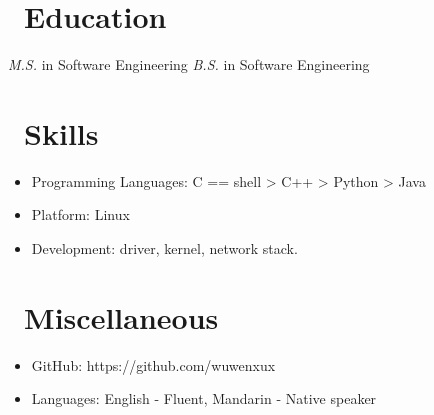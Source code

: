 \documentclass{resume}
\begin{document}

\section{\faGraduationCap\ Education}
\textit{M.S.} in Software Engineering 
\textit{B.S.} in Software Engineering 

\section{\faCogs\ Skills}
\begin{itemize}[parsep=0.5ex]
  \item Programming Languages: C == shell > C++  > Python > Java
  \item Platform: Linux
  \item Development: driver, kernel, network stack.
\end{itemize}

\section{\faInfo\ Miscellaneous}
\begin{itemize}[parsep=0.5ex]
  \item GitHub: https://github.com/wuwenxux
  \item Languages: English - Fluent, Mandarin - Native speaker
\end{itemize}

%
%
\end{document}
